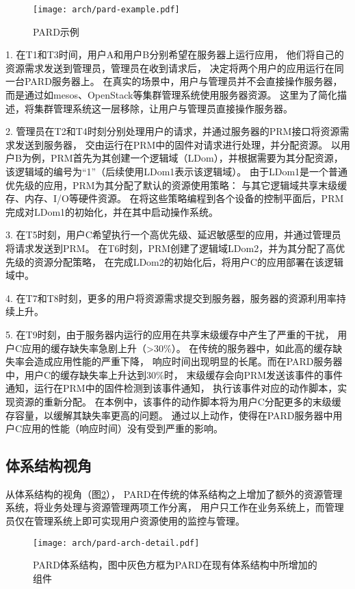 \begin{figure}[tb]
  \centering
  \texttt{[image: arch/pard-example.pdf]}
  \caption{PARD示例}
  \label{fig:pard-example}
\end{figure}

1. 在T1和T3时间，用户A和用户B分别希望在服务器上运行应用，
他们将自己的资源需求发送到管理员，管理员在收到请求后，
决定将两个用户的应用运行在同一台PARD服务器上。
在真实的场景中，用户与管理员并不会直接操作服务器，
而是通过如mesos\cite{}、OpenStack\cite{}等集群管理系统使用服务器资源。
这里为了简化描述，将集群管理系统这一层移除，让用户与管理员直接操作服务器。

2. 管理员在T2和T4时刻分别处理用户的请求，并通过服务器的PRM接口将资源需求发送到服务器，
交由运行在PRM中的固件对请求进行处理，并分配资源。
以用户B为例，PRM首先为其创建一个逻辑域（LDom），并根据需要为其分配资源，
该逻辑域的编号为``1''（后续使用LDom1表示该逻辑域）。
由于LDom1是一个普通优先级的应用，PRM为其分配了默认的资源使用策略：
与其它逻辑域共享末级缓存、内存、I/O等硬件资源。
在将这些策略编程到各个设备的控制平面后，PRM完成对LDom1的初始化，并在其中启动操作系统。

3. 在T5时刻，用户C希望执行一个高优先级、延迟敏感型的应用，并通过管理员将请求发送到PRM。
在T6时刻，PRM创建了逻辑域LDom2，并为其分配了高优先级的资源分配策略，
在完成LDom2的初始化后，将用户C的应用部署在该逻辑域中。

4. 在T7和T8时刻，更多的用户将资源需求提交到服务器，服务器的资源利用率持续上升。

5. 在T9时刻，由于服务器内运行的应用在共享末级缓存中产生了严重的干扰，
用户C应用的缓存缺失率急剧上升（>30\%）。
在传统的服务器中，如此高的缓存缺失率会造成应用性能的严重下降，
响应时间出现明显的长尾。而在PARD服务器中，用户C的缓存缺失率上升达到30\%时，
末级缓存会向PRM发送该事件的事件通知，运行在PRM中的固件检测到该事件通知，
执行该事件对应的动作脚本，实现资源的重新分配。
在本例中，该事件的动作脚本将为用户C分配更多的末级缓存容量，以缓解其缺失率更高的问题。
通过以上动作，使得在PARD服务器中用户C应用的性能（响应时间）没有受到严重的影响。


\subsection{体系结构视角}

从体系结构的视角（图\ref{fig:pard-arch-detail}），
PARD在传统的体系结构之上增加了额外的资源管理系统，将业务处理与资源管理两项工作分离，
用户只工作在业务系统上，而管理员仅在管理系统上即可实现用户资源使用的监控与管理。

\begin{figure}[tb]
  \centering
  \texttt{[image: arch/pard-arch-detail.pdf]}
  \caption[PARD体系结构]{PARD体系结构，图中灰色方框为PARD在现有体系结构中所增加的组件}
  \label{fig:pard-arch-detail}
\end{figure}

